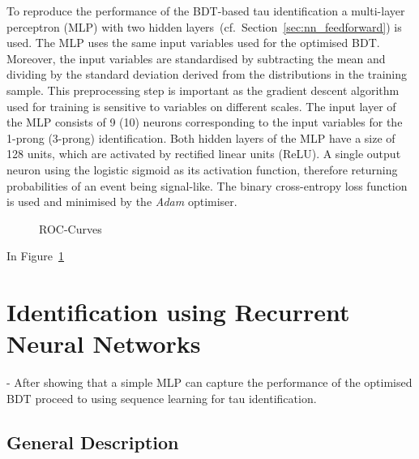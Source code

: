 To reproduce the performance of the BDT-based tau identification a multi-layer
perceptron (MLP) with two hidden layers~(cf.\ Section~\ref{sec:nn_feedforward})
is used. The MLP uses the same input variables used for the optimised BDT.
Moreover, the input variables are standardised by subtracting the mean and
dividing by the standard deviation derived from the distributions in the
training sample. This preprocessing step is important as the gradient descent
algorithm used for training is sensitive to variables on different scales. The
input layer of the MLP consists of 9 (10) neurons corresponding to the input
variables for the 1-prong (3-prong) identification. Both hidden layers of the
MLP have a size of 128 units, which are activated by rectified linear units
(ReLU). A single output neuron using the logistic sigmoid as its activation
function, therefore returning probabilities of an event being signal-like. The
binary cross-entropy loss function is used and minimised by the \emph{Adam}
optimiser.

\begin{figure}[htb]
  \begin{subfigure}[t]{0.48\textwidth}
    \centering
  \end{subfigure}\hfill
  \begin{subfigure}[t]{0.48\textwidth}
    \centering
  \end{subfigure}
  \caption{ROC-Curves}
  \label{fig:roc_mlp_bdt_comparison}
\end{figure}

In Figure~\ref{fig:roc_mlp_bdt_comparison}


\section{Identification using Recurrent Neural Networks}
\label{sec:rnn_id}

- After showing that a simple MLP can capture the performance of the optimised BDT proceed to using sequence learning for tau identification.

\subsection{General Description}
\label{sec:rnn_descr}

